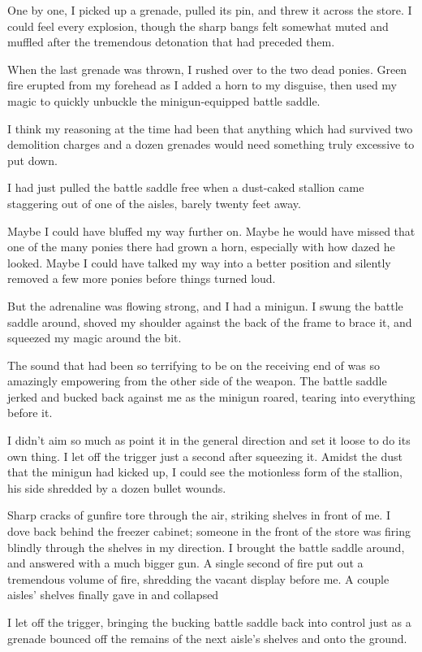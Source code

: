 One by one, I picked up a grenade, pulled its pin, and threw it across the store. I could feel every explosion, though the sharp bangs felt somewhat muted and muffled after the tremendous detonation that had preceded them.

When the last grenade was thrown, I rushed over to the two dead ponies. Green fire erupted from my forehead as I added a horn to my disguise, then used my magic to quickly unbuckle the minigun-equipped battle saddle.

I think my reasoning at the time had been that anything which had survived two demolition charges and a dozen grenades would need something truly excessive to put down.

I had just pulled the battle saddle free when a dust-caked stallion came staggering out of one of the aisles, barely twenty feet away.

Maybe I could have bluffed my way further on. Maybe he would have missed that one of the many ponies there had grown a horn, especially with how dazed he looked. Maybe I could have talked my way into a better position and silently removed a few more ponies before things turned loud.

But the adrenaline was flowing strong, and I had a minigun. I swung the battle saddle around, shoved my shoulder against the back of the frame to brace it, and squeezed my magic around the bit.

The sound that had been so terrifying to be on the receiving end of was so amazingly empowering from the other side of the weapon. The battle saddle jerked and bucked back against me as the minigun roared, tearing into everything before it.

I didn’t aim so much as point it in the general direction and set it loose to do its own thing. I let off the trigger just a second after squeezing it. Amidst the dust that the minigun had kicked up, I could see the motionless form of the stallion, his side shredded by a dozen bullet wounds.

Sharp cracks of gunfire tore through the air, striking shelves in front of me. I dove back behind the freezer cabinet; someone in the front of the store was firing blindly through the shelves in my direction. I brought the battle saddle around, and answered with a much bigger gun. A single second of fire put out a tremendous volume of fire, shredding the vacant display before me. A couple aisles’ shelves finally gave in and collapsed

I let off the trigger, bringing the bucking battle saddle back into control just as a grenade bounced off the remains of the next aisle’s shelves and onto the ground.

